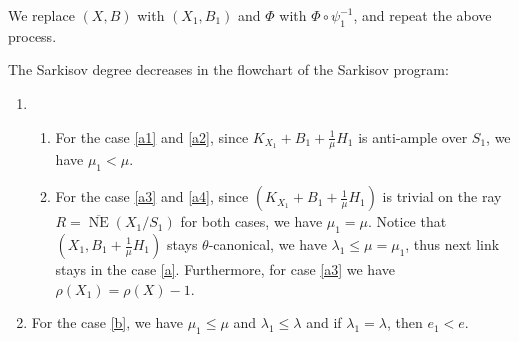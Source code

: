 We replace $(X,B)$ with $(X_1,B_1)$ and $\Phi$ with $\Phi\circ\psi_1^{-1}$, and repeat the above process. 
\begin{remark} \label{R-Sarkisovdeg}
  The Sarkisov degree decreases in the flowchart of the Sarkisov program:
  \begin{enumerate}
    \item
          \begin{enumerate}
            \item For the case \ref{a1} and \ref{a2},  since $ K_{X_1}+B_1+\frac{1}{\mu}H_1 $ is anti-ample over $S_1$, we have    $\mu_1<\mu$.
            \item For the case \ref{a3} and \ref{a4}, since $ (K_{X_1}+B_1+\frac{1}{\mu}H_1) $ is trivial on the ray $ R=\overline{\operatorname{NE}}(X_1/S_1) $ for both cases, we have $\mu_1=\mu$.
                  Notice that $ (X_1,B_1+\frac{1}{\mu}H_1) $ stays $ \theta $-canonical, we have $\lambda_1\leqslant \mu=\mu_1$, thus next link stays in the case \ref{a}. Furthermore,   for case \ref{a3} we have $\rho(X_1)=\rho(X)-1$.
          \end{enumerate}
    \item For the case \ref{b}, we have  $\mu_1\leqslant \mu$ and $\lambda_1\leqslant \lambda$ and if $ \lambda_1=\lambda $, then   $e_1<e$.
  \end{enumerate}
\end{remark}

